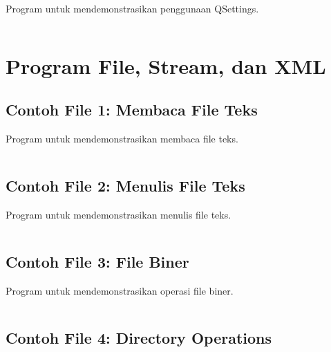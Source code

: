 Program untuk mendemonstrasikan penggunaan QSettings.

\begin{lstlisting}[language=c++, caption=QSettings]

\end{lstlisting}

\section{Program File, Stream, dan XML}

\subsection{Contoh File 1: Membaca File Teks}

Program untuk mendemonstrasikan membaca file teks.

\begin{lstlisting}[language=c++, caption=Membaca File Teks]

\end{lstlisting}

\subsection{Contoh File 2: Menulis File Teks}

Program untuk mendemonstrasikan menulis file teks.

\begin{lstlisting}[language=c++, caption=Menulis File Teks]

\end{lstlisting}

\subsection{Contoh File 3: File Biner}

Program untuk mendemonstrasikan operasi file biner.

\begin{lstlisting}[language=c++, caption=File Biner]

\end{lstlisting}

\subsection{Contoh File 4: Directory Operations}


